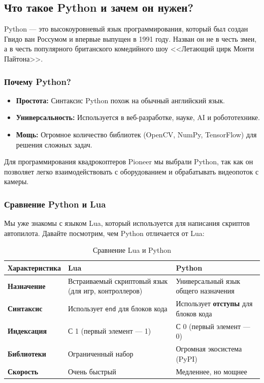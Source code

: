\subsection{Что такое Python и зачем он нужен?}

Python — это высокоуровневый язык программирования, который был создан Гвидо ван Россумом и впервые выпущен в 1991 году. Назван он не в честь змеи, а в честь популярного британского комедийного шоу <<Летающий цирк Монти Пайтона>>.

\subsubsection*{Почему Python?}
\begin{itemize}
    \item \textbf{Простота:} Синтаксис Python похож на обычный английский язык.
    \item \textbf{Универсальность:} Используется в веб-разработке, науке, AI и робототехнике.
    \item \textbf{Мощь:} Огромное количество библиотек (OpenCV, NumPy, TensorFlow) для решения сложных задач.
\end{itemize}

Для программирования квадрокоптеров Pioneer мы выбрали Python, так как он позволяет легко взаимодействовать с оборудованием и обрабатывать видеопоток с камеры.

\subsubsection*{Сравнение Python и Lua}
Мы уже знакомы с языком Lua, который используется для написания скриптов автопилота. Давайте посмотрим, чем Python отличается от Lua:

\begin{table}[H]
\centering
\begin{tabularx}{\textwidth}{>{\bfseries}l X X}
\toprule
Характеристика & \textbf{Lua} & \textbf{Python} \\
\midrule
Назначение & Встраиваемый скриптовый язык (для игр, контроллеров) & Универсальный язык общего назначения \\
Синтаксис & Использует \texttt{end} для блоков кода & Использует \textbf{отступы} для блоков кода \\
Индексация & С 1 (первый элемент — 1) & С 0 (первый элемент — 0) \\
Библиотеки & Ограниченный набор & Огромная экосистема (PyPI) \\
Скорость & Очень быстрый & Медленнее, но мощнее \\
\bottomrule
\end{tabularx}
\caption{Сравнение Lua и Python}
\end{table}

